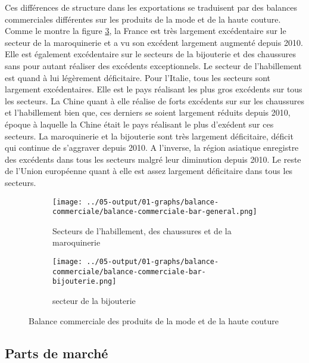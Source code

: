 \documentclass[french,10pt,a4paper]{article}
\begin{document}
Ces différences de structure dans les exportations se traduisent par des balances commerciales différentes sur les produits de la mode et de la haute couture. Comme le montre la figure \ref{fig:balance-commerciale}, la France est très largement excédentaire sur le secteur de la maroquinerie et a vu son excédent largement augmenté depuis 2010. Elle est également excédentaire sur le secteurs de la bijouterie et des chaussures sans pour autant réaliser des excédents exceptionnels. Le secteur de l'habillement est quand à lui légèrement déficitaire. Pour l'Italie, tous les secteurs sont largement excédentaires. Elle est le pays réalisant les plus gros excédents sur tous les secteurs. La Chine quant à elle réalise de forts excédents sur sur les chaussures et l'habillement bien que, ces derniers se soient largement réduits depuis 2010, époque à laquelle la Chine était le pays réalisant le plus d'exédent sur ces secteurs. La maroquinerie et la bijouterie sont très largement déficitaire, déficit qui continue de s'aggraver depuis 2010. A l'inverse, la région asiatique enregistre des excédents dans tous les secteurs malgré leur diminution depuis 2010. Le reste de l'Union européenne quant à elle est assez largement déficitaire dans tous les secteurs.  

\begin{figure}[!h]
  \centering
  \begin{subfigure}{\textwidth}
    \centering    
    \texttt{[image: ../05-output/01-graphs/balance-commerciale/balance-commerciale-bar-general.png]}
    \caption{Secteurs de l'habillement, des chaussures et de la maroquinerie}
    \label{fig:balance-commerciale-bar-general}
  \end{subfigure}
  \vspace{0.5cm}
  \begin{subfigure}{\textwidth}
    \centering \texttt{[image: ../05-output/01-graphs/balance-commerciale/balance-commerciale-bar-bijouterie.png]}
 \caption{secteur de la bijouterie}
 \label{fig:balance-commerciale-bar-bijouterie}
  \end{subfigure}
  \caption{Balance commerciale des produits de la mode et de la haute couture}
  \label{fig:balance-commerciale}
\end{figure}


\subsection{Parts de marché}
\end{document}
